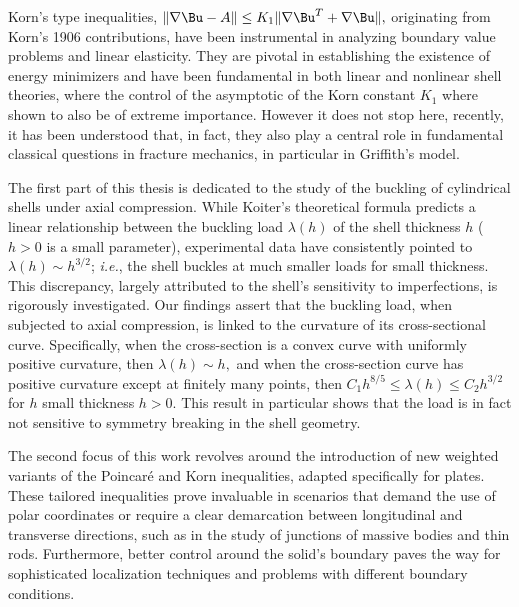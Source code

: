 

Korn's type inequalities, $\|\nabla \Bu -A\|\leq K_1 \|\nabla \Bu ^T + \nabla \Bu\|,$ originating from Korn's 1906 contributions, have been instrumental in analyzing boundary value problems and linear elasticity. They are pivotal in establishing the existence of energy minimizers and have been fundamental in both linear and nonlinear shell theories, where the control of the asymptotic of the Korn constant $K_1$ where shown to also be of extreme importance. However it does not stop here, recently, it has been understood that, in fact, they also play a central role in fundamental classical questions in fracture mechanics, in particular in Griffith's model.

The first part of this thesis is dedicated to the study of the buckling of cylindrical shells under axial compression. While Koiter's theoretical formula predicts a linear relationship between the buckling load $\lambda(h)$ of the shell thickness $h$ ($h>0$ is a small parameter), experimental data have consistently pointed to $\lambda(h)\sim h^{3/2}$; \textit{i.e.}, the shell buckles at much smaller loads for small thickness.  This discrepancy, largely attributed to the shell's sensitivity to imperfections, is rigorously investigated. Our findings assert that the buckling load, when subjected to axial compression, is linked to the curvature of its cross-sectional curve. Specifically, when the cross-section is a convex curve with uniformly positive curvature, then $\lambda(h)\sim h,$ and when the cross-section curve has positive curvature except at finitely many points, then $C_1h^{8/5}\leq \lambda(h)\leq C_2h^{3/2}$ for $h$ small thickness $h>0.$  This result in particular shows that the load is in fact not sensitive to symmetry breaking in the shell geometry. 

The second focus of this work revolves around the introduction of new weighted variants of the Poincaré and Korn inequalities, adapted specifically for plates. These tailored inequalities prove invaluable in scenarios that demand the use of polar coordinates or require a clear demarcation between longitudinal and transverse directions, such as in the study of junctions of massive bodies and thin rods.  Furthermore, better control around the solid's boundary paves the way for sophisticated localization techniques and problems with different boundary conditions.

